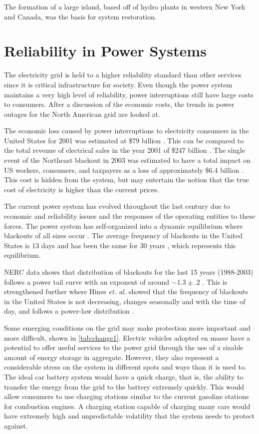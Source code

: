 The formation of a large island, based off of hydro plants in western New York and Canada, was the basis for system restoration.
 

\section{Reliability in Power Systems}
The electricity grid is held to a higher reliability standard than other services since it is critical infrastructure for society.  Even though the power system maintains a very high level of reliability, power interruptions still have large costs to consumers.  After a discussion of the economic costs, the trends in power outages for the North American grid are looked at.

The economic loss caused by power interruptions to electricity consumers in the United States for 2001 was estimated at \$79 billion \cite{lacommare_2006}.  This can be compared to the total revenue of electrical sales in the year 2001 of \$247 billion \cite{eia_sales}.  The single event of the Northeast blackout in 2003 was estimated to have a total impact on US workers, consumers, and taxpayers as a loss of approximately \$6.4 billion \cite{anderson_2003}.  This cost is hidden from the system, but may entertain the notion that the true cost of electricity is higher than the current prices.  

The current power system has evolved throughout the last century due to economic and reliability issues and the responses of the operating entities to these forces.  The power system has self-organized into a dynamic equilibrium where blackouts of all sizes occur \cite{dobson_2001}.  The average frequency of blackouts in the United States is 13 days and has been the same for 30 years \cite{carreras_2004}, which represents this equilibrium.  
	
NERC data shows that distribution of blackouts for the last 15 years (1988-2003) follows a power tail curve with an exponent of around $-1.3\pm.2$ \cite{carreras_2004}. This is strengthened further where Hines {\it et. al.} showed that the frequency of blackouts in the United States is not decreasing, changes seasonally and with the time of day, and follows a power-law distribution \cite{hines_2008,hines_2009}.

Some emerging conditions on the grid may make protection more important and more difficult, shown in \cref{tab:change1}.  Electric vehicles adopted en masse have a potential to offer useful services to the power grid through the use of a sizable amount of energy storage in aggregate.  However, they also represent a considerable stress on the system in different spots and ways than it is used to.  The ideal car battery system would have a quick charge, that is, the ability to transfer the energy from the grid to the battery extremely quickly.  This would allow consumers to use charging stations similar to the current gasoline stations for combustion engines.  A charging station capable of charging many cars would have extremely high and unpredictable volatility that the system needs to protect against.


